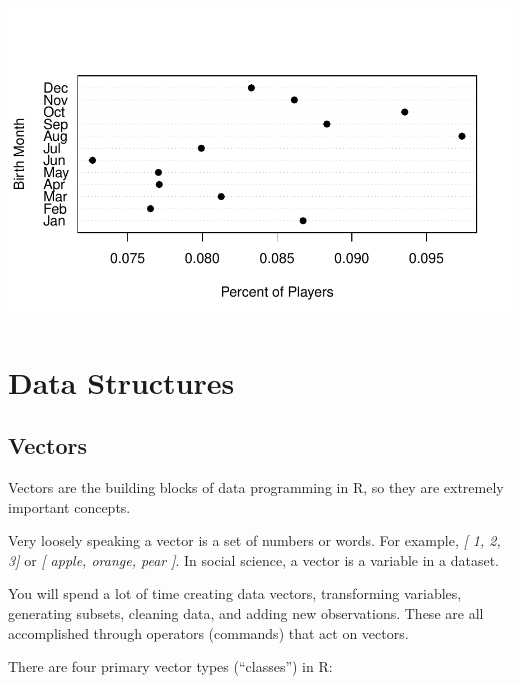 \documentclass[]{book}
\theoremstyle{definition}
\theoremstyle{definition}
\theoremstyle{definition}
\theoremstyle{remark}
\begin{document}
\begin{center}\includegraphics[width=0.7\linewidth]{DS4PS-I_files/figure-latex/unnamed-chunk-23-1} \end{center}

\hypertarget{data-structures}{%
\chapter{Data Structures}\label{data-structures}}

\hypertarget{vectors}{%
\section{Vectors}\label{vectors}}

Vectors are the building blocks of data programming in R, so they are
extremely important concepts.

Very loosely speaking a vector is a set of numbers or words. For
example, \emph{{[} 1, 2, 3{]}} or \emph{{[} apple, orange, pear {]}}. In
social science, a vector is a variable in a dataset.

You will spend a lot of time creating data vectors, transforming
variables, generating subsets, cleaning data, and adding new
observations. These are all accomplished through operators (commands)
that act on vectors.

There are four primary vector types (``classes'') in R:
\end{document}
